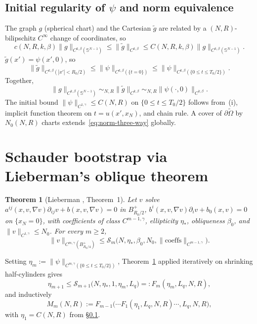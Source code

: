 \documentclass[11pt,a4paper]{article}
\newtheorem{theorem}{Theorem}[section]
\theoremstyle{definition}
\theoremstyle{remark}
\newcommand{\Om}{\widetilde{\Omega}}
\newcommand{\Sph}{\mathbb{S}^{N-1}}
\newcommand{\norm}[1]{\lVert#1\rVert}
\newcommand{\bdry}{\partial}
\begin{document}
\subsection{Initial regularity of $\psi$ and norm equivalence}\label{ss:hodo-norm}

The graph $g$ (spherical chart) and the Cartesian $\widetilde g$ are
related by a $(N,R)$-bilipschitz $C^{\infty}$ change of coordinates, so
\begin{equation}\label{eq:norm-equiv-g-tildeg}
   c(N,R,k,\beta)\norm{g}_{C^{k,\beta}(\Sph)}
   \le\norm{\widetilde g}_{C^{k,\beta}}
   \le C(N,R,k,\beta)\norm{g}_{C^{k,\beta}(\Sph)}.
\end{equation}
$\widetilde g(x')=\psi(x',0)$, so
\begin{equation}\label{eq:norm-equiv-tildeg-psi}
   \norm{\widetilde g}_{C^{k,\beta}(|x'|<R_{0}/2)}
   \le\norm{\psi}_{C^{k,\beta}(\{t=0\})}
   \le\norm{\psi}_{C^{k,\beta}(\{0\le t\le T_{0}/2\})}.
\end{equation}
Together,
\begin{equation}\label{eq:norm-three-way}
   \norm{g}_{C^{k,\beta}(\Sph)}\sim_{N,R}
   \norm{\widetilde g}_{C^{k,\beta}}\sim_{N,R}
   \norm{\psi(\cdot,0)}_{C^{k,\beta}}.
\end{equation}
The initial bound $\norm{\psi}_{C^{1,\gamma}}\le C(N,R)$ on
$\{0\le t\le T_{0}/2\}$ follows from~(i), implicit function theorem on
$t=u(x',x_{N})$, and chain rule. A cover of $\bdry\Om$ by
$N_{0}(N,R)$ charts extends~\eqref{eq:norm-three-way} globally.

\section{Schauder bootstrap via Lieberman's oblique theorem}\label{sec:schauder}

\begin{theorem}[Lieberman \cite{Li86}, Theorem~1]\label{thm:lieberman}
Let $v$ solve
$a^{ij}(x,v,\nabla v)\partial_{ij}v+b(x,v,\nabla v)=0$ in $B^{+}_{R_{0}/2}$,
$b^{i}(x,v,\nabla v)\partial_{i}v+b_{0}(x,v)=0$ on $\{x_{N}=0\}$, with
coefficients of class $C^{m-1,\gamma}$, ellipticity $\eta_{*}$,
obliqueness $\beta_{0}$, and $\norm{v}_{C^{1,\gamma}}\le N_{0}$. For
every $m\ge 2$,
\[
   \norm{v}_{C^{m,\gamma}(B^{+}_{R_{0}/4})}
      \le \mathcal{S}_{m}\bigl(N,\eta_{*},\beta_{0},N_{0},
                                \norm{\mathrm{coeffs}}_{C^{m-1,\gamma}}\bigr).
\]
\end{theorem}

Setting $\eta_{m}:=\norm{\psi}_{C^{m,\gamma}(\{0\le t\le T_{0}/2\})}$,
Theorem~\ref{thm:lieberman} applied iteratively on shrinking half-cylinders
gives
\begin{equation}\label{eq:eta-recursion}
   \eta_{m+1}\le\mathcal{S}_{m+1}\bigl(N,\eta_{*},1,\eta_{m},L_{q}\bigr)
                =:F_{m}(\eta_{m},L_{q},N,R),
\end{equation}
and inductively
\begin{equation}\label{eq:Mm}
   \boxed{\;M_{m}(N,R):=F_{m-1}\bigl(\cdots F_{1}(\eta_{1},L_{q},N,R)
                                            \cdots,L_{q},N,R\bigr),\;}
\end{equation}
with $\eta_{1}=C(N,R)$ from \S\ref{ss:hodo-norm}.
\end{document}
